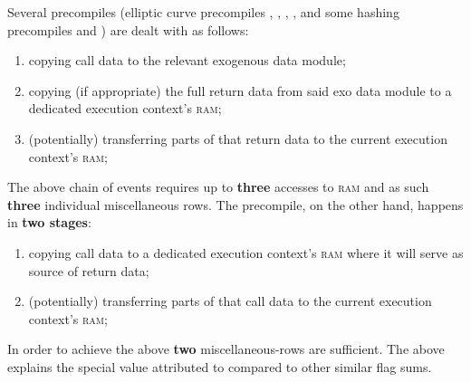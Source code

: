 \saNote{}
Several precompiles (elliptic curve precompiles \instEcrecover{}, \instEcadd{}, \instEcmul{}, \instEcpairing{}, \instPVerify{}
and some hashing precompiles \instShaTwo{} and \instRipemd{})
are dealt with as follows:
\begin{enumerate}
	\item copying call data to the relevant exogenous data module;
	\item copying (if appropriate) the full return data from said exo data module to a dedicated execution context's \textsc{ram};
	\item (potentially) transferring parts of that return data to the current execution context's \textsc{ram};
\end{enumerate}
The above chain of events requires up to \textbf{three} accesses to \textsc{ram} and as such \textbf{three} individual miscellaneous rows.
The \instIdentity{} precompile, on the other hand, happens in \textbf{two stages}:
\begin{enumerate}
	\item copying call data to a dedicated execution context's \textsc{ram} where it will serve as source of return data;
	\item (potentially) transferring parts of that call data to the current execution context's \textsc{ram};
\end{enumerate}
In order to achieve the above \textbf{two} miscellaneous-rows are sufficient.
The above explains the special value attributed to \locFlagSumIdentitySuccess{} compared to other similar flag sums.
